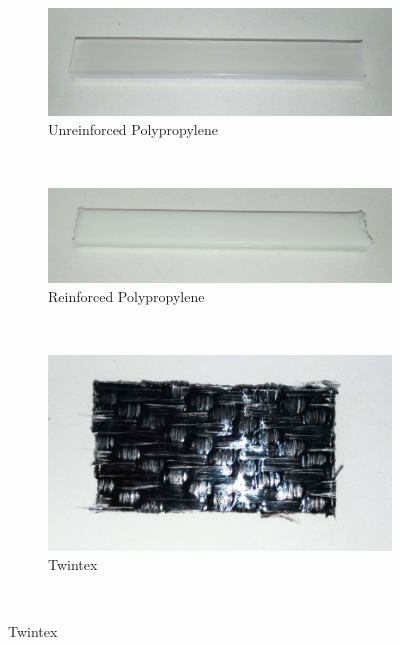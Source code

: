\begin{figure}[h]
	\centering
	\begin{subfigure}{0.45\textwidth}
		\centering
		\includegraphics[width=\textwidth]{img/neat_PP.jpg}
		\caption{Unreinforced Polypropylene}
		\label{fig:uPP}
	\end{subfigure}
	~ %
	\begin{subfigure}{0.45\textwidth}
		\centering
		\includegraphics[width=\textwidth]{img/reinf_PP.jpg}
		\caption{Reinforced Polypropylene}
		\label{fig:rPP}
	\end{subfigure}
	\\
	\begin{subfigure}{0.6\textwidth}
		\centering
		\includegraphics[width=\textwidth]{img/Twintex.jpg}
		\caption[short caption]{Twintex}
		\label{fig:twintex}
	\end{subfigure}
	\\

\end{figure}
